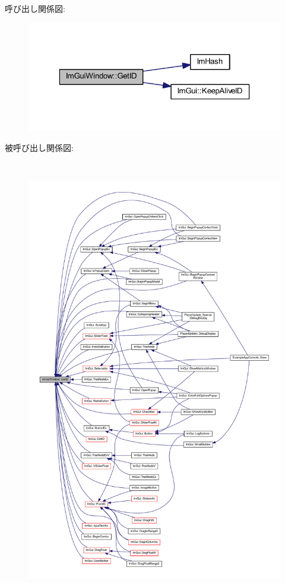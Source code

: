 呼び出し関係図\+:\nopagebreak
\begin{figure}[H]
\begin{center}
\leavevmode
\includegraphics[width=323pt]{struct_im_gui_window_a66400a63bc0b54d7d29e08d1b1b1a42b_cgraph}
\end{center}
\end{figure}
被呼び出し関係図\+:\nopagebreak
\begin{figure}[H]
\begin{center}
\leavevmode
\includegraphics[height=550pt]{struct_im_gui_window_a66400a63bc0b54d7d29e08d1b1b1a42b_icgraph}
\end{center}
\end{figure}
\mbox{\label{struct_im_gui_window_aae21dffb343cabca9414499b827912a8}} 
